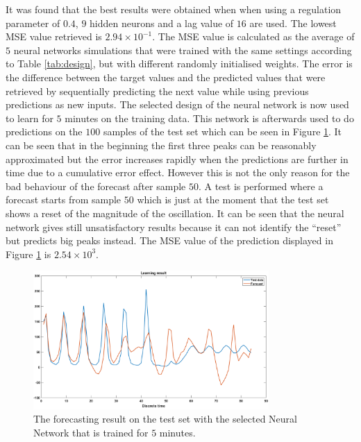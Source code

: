 \documentclass[a4paper,10pt]{article}
\begin{document}
It was found that the best results were obtained when when using a regulation parameter of $ 0.4 $, $ 9 $ hidden neurons and a lag value of $ 16 $ are used. The lowest MSE value retrieved is $ 2.94\times10^{-1} $. The MSE value is calculated as the average of $ 5 $ neural networks simulations that were trained with the same settings according to Table \ref{tab:design}, but with different randomly initialised weights. The error is the difference between the target values and the predicted values that were retrieved by sequentially predicting the next value while using previous predictions as new inputs. The selected design of the neural network is now used to learn for $ 5 $ minutes on the training data. This network is afterwards used to do predictions on the $ 100 $ samples of the test set which can be seen in Figure \ref{fig:After_simulation_of_5min_per}. It can be seen that in the beginning the first three peaks can be reasonably approximated but the error increases rapidly when the predictions are further in time due to a cumulative error effect. However this is not the only reason for the bad behaviour of the forecast after sample $ 50 $. A test is performed where a forecast starts from sample $ 50 $ which is just at the moment that the test set shows a reset of the magnitude of the oscillation. It can be seen that the neural network gives still unsatisfactory results because it can not identify the ``reset'' but predicts big peaks instead. The MSE value of the prediction displayed in Figure \ref{fig:After_simulation_of_5min_per} is $ 2.54\times10^{3} $.

\begin{figure}[h!]
	\centering
	\includegraphics[width=0.8\textwidth]{learning_result.png}
	\caption{The forecasting result on the test set with the selected Neural Network that is trained for $ 5 $ minutes.}
	\label{fig:After_simulation_of_5min_per}
\end{figure}
\end{document}
